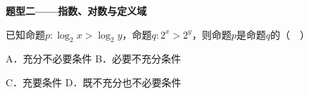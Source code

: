 \documentclass[12pt,a4paper]{article}
\newcommand{\qtitle}[1]{{\Large\bfseries\color[HTML]{1F3864}#1}\par\vspace{0.9em}}
\begin{document}
\qtitle{题型二——指数、对数与定义域}

已知命题$p:\log_2 x>\log_2 y$，命题$q:2^x>2^y$，则命题$p$是命题$q$的（　）\par
\vspace{0.9em}
A．充分不必要条件 \qquad\qquad B．必要不充分条件\par
\vspace{0.45em}
C．充要条件 \qquad\qquad D．既不充分也不必要条件\par
\vspace{0.45em}
\end{document}
